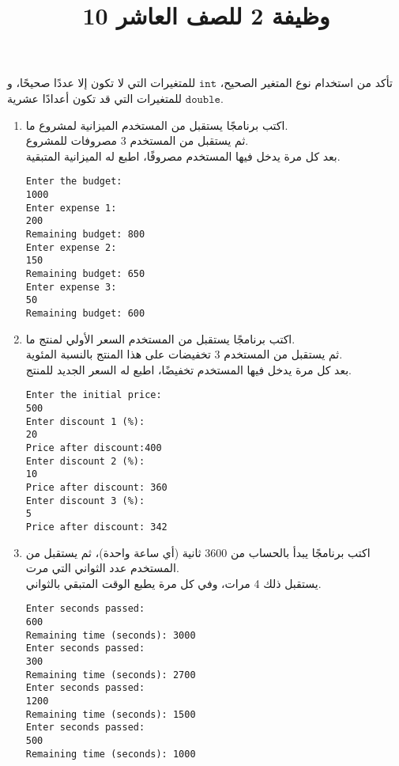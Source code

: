 \documentclass[12pt]{article}
\title{وظيفة 2 للصف العاشر 10}
\begin{document}
\maketitle
\thispagestyle{fancy}

\begin{note}
    تأكد من استخدام نوع المتغير الصحيح، $\mathtt{int}$ للمتغيرات التي لا تكون إلا عددًا صحيحًا، و $\mathtt{double}$ للمتغيرات التي قد تكون أعدادًا عشرية.
\end{note}

\begin{enumerate}

\item
اكتب برنامجًا يستقبل من المستخدم الميزانية لمشروع ما. \\
ثم يستقبل من المستخدم 3 مصروفات للمشروع. \\
بعد كل مرة يدخل فيها المستخدم مصروفًا، اطبع له الميزانية المتبقية. \\
\begin{example}
\begin{english}
\begin{lstlisting}
Enter the budget:
1000
Enter expense 1:
200
Remaining budget: 800
Enter expense 2:
150
Remaining budget: 650
Enter expense 3:
50
Remaining budget: 600
\end{lstlisting}
\end{english}
\end{example}

\clearpage
\item
اكتب برنامجًا يستقبل من المستخدم السعر الأولي لمنتج ما. \\
ثم يستقبل من المستخدم 3 تخفيضات على هذا المنتج بالنسبة المئوية. \\
بعد كل مرة يدخل فيها المستخدم تخفيضًا، اطبع له السعر الجديد للمنتج. \\
\begin{example}
\begin{english}
\begin{lstlisting}
Enter the initial price:
500
Enter discount 1 (%):
20
Price after discount:400
Enter discount 2 (%):
10
Price after discount: 360
Enter discount 3 (%):
5
Price after discount: 342
\end{lstlisting}
\end{english}
\end{example}

\clearpage
\item
اكتب برنامجًا يبدأ بالحساب من 3600 ثانية (أي ساعة واحدة)، ثم يستقبل من المستخدم عدد الثواني التي مرت. \\
يستقبل ذلك 4 مرات، وفي كل مرة يطبع الوقت المتبقي بالثواني. \\
\begin{example}
\begin{english}
\begin{lstlisting}
Enter seconds passed:
600
Remaining time (seconds): 3000
Enter seconds passed:
300
Remaining time (seconds): 2700
Enter seconds passed:
1200
Remaining time (seconds): 1500
Enter seconds passed:
500
Remaining time (seconds): 1000
\end{lstlisting}
\end{english}
\end{example}


\end{enumerate}
\end{document}

